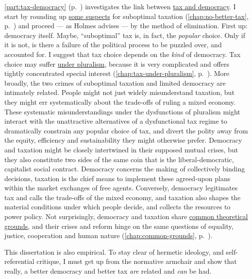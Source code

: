 \autoref{part:tax-democracy} (p.~\pageref{part:tax-democracy}) investigates the link between \hyperref[part:tax-democracy]{tax and democracy}.
I start by rounding up \hyperref[chap:no-better-tax]{some suspects} for suboptimal taxation (\autoref{chap:no-better-tax}, p.~\pageref{chap:no-better-tax}) and proceed --- as Holmes advises --- by the method of elimination.
First up:
democracy itself.
Maybe, ``suboptimal'' tax is, in fact, the \emph{popular} choice.
Only if it is not, is there a failure of the political process to be puzzled over, and accounted for.
I suggest that tax choice depends on the \emph{kind} of democracy.
Tax choice may suffer \hyperref[chap:tax-under-pluralism]{under pluralism}, because it is very complicated and offers tightly concentrated special interest (\autoref{chap:tax-under-pluralism}, p.~\pageref{chap:tax-under-pluralism}).
More broadly, the two crimes of suboptimal taxation and limited democracy are intimately related.
People might not just widely misunderstand taxation, but they might err systematically about the trade-offs of ruling a mixed economy.
These systematic misunderstandings under the dysfunctions of pluralism might interact with the unattractive alternatives of a dysfunctional tax regime to dramatically constrain any popular choice of tax, and divert the polity away from the equity, efficiency and sustainability they might otherwise prefer.
Democracy and taxation might be closely intertwined in their supposed mutual crises, but they also constitute two sides of the same coin that is the liberal-democratic, capitalist social contract.
Democracy concerns the making of collectively binding decisions, taxation is the chief means to implement these agreed-upon plans within the market exchanges of free agents.
Conversely, democracy legitimates tax and calls the trade-offs of the mixed economy, and taxation also shapes the material conditions under which people decide, and collects the resources to power policy.
Not surprisingly, democracy and taxation share \hyperref[chap:common-grounds]{common theoretical grounds}, and their crises and reform hinge on the same questions of equality, justice, cooperation and human nature (\autoref{chap:common-grounds}, p.~\pageref{chap:common-grounds}).

This dissertation is also empirical.
To stay clear of hermetic ideology, and self-referential critique, I must get up from the normative armchair and show that really, a better democracy and better tax \emph{are} related and \emph{can} be had.

